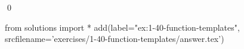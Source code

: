 
\begin{ex}
  \label{ex:1-40-function-templates}
  
  \qed
\end{ex}
\begin{python0}
from solutions import *
add(label="ex:1-40-function-templates",
    srcfilename='exercises/1-40-function-templates/answer.tex')
\end{python0}
